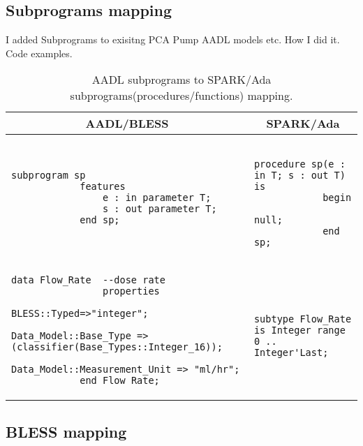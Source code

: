\subsection{Subprograms mapping}
\label{codegen:mapping:subprograms}

I added Subprograms to exisitng PCA Pump AADL models etc.
How I did it. Code examples.

\begin{table}[!ht]
	\caption{AADL subprograms to SPARK/Ada subprograms(procedures/functions) mapping.}
	\label{table:subprograms_mapping}
	\centering
  	\begin{tabular}{ | p{3in} | p{3in} |}

		\hline
		\multicolumn{1}{|c|}{\textbf{AADL/BLESS}} & \multicolumn{1}{|c|}{\textbf{SPARK/Ada}} \\ \hline

		\begin{lstlisting}[language=aadl]
			subprogram sp
			features
				e : in parameter T;
				s : out parameter T;
			end sp;
		\end{lstlisting} 
		& 
		\begin{lstlisting}
			procedure sp(e : in T; s : out T) is 
			begin
				null;
			end sp;
		\end{lstlisting} 

		\\ \hline

		\begin{lstlisting}[language=aadl]
			data Flow_Rate  --dose rate
  				properties
    				BLESS::Typed=>"integer";
    				Data_Model::Base_Type => (classifier(Base_Types::Integer_16));
    				Data_Model::Measurement_Unit => "ml/hr";
			end Flow_Rate;
		\end{lstlisting} 
		& 
		\begin{lstlisting}
			subtype Flow_Rate is Integer range 0 .. Integer'Last;
		\end{lstlisting} 

		\\ \hline
	\end{tabular}
\end{table}



\subsection{BLESS mapping}
\label{codegen:mapping:bless}


